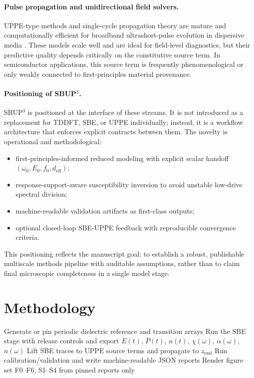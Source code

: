 \documentclass[aps,pra,twocolumn,reprint,superscriptaddress,nofootinbib]{revtex4-2}
\begin{document}
\paragraph{Pulse propagation and unidirectional field solvers.}
UPPE-type methods and single-cycle propagation theory are mature and
computationally efficient for broadband ultrashort-pulse evolution in dispersive
media \cite{brabec1997nonlinear,kolesik2002nonlinear,kolesik2004unidirectional}.
These models scale well and are ideal for field-level diagnostics, but their
predictive quality depends critically on the constitutive source term. In
semiconductor applications, this source term is frequently phenomenological or
only weakly connected to first-principles material provenance.

\paragraph{Positioning of SBUP$^3$.}
SBUP$^3$ is positioned at the interface of these streams. It is not introduced
as a replacement for TDDFT, SBE, or UPPE individually; instead, it is a
workflow architecture that enforces explicit contracts between them. The novelty
is operational and methodological:
\begin{itemize}
\item first-principles-informed reduced modeling with explicit scalar handoff
$(\omega_0, E_0, f_0, d_{\mathrm{eff}})$;
\item response-support-aware susceptibility inversion to avoid unstable
low-drive spectral division;
\item machine-readable validation artifacts as first-class outputs;
\item optional closed-loop SBE-UPPE feedback with reproducible convergence
criteria.
\end{itemize}
This positioning reflects the manuscript goal: to establish a robust,
publishable multiscale methods pipeline with auditable assumptions, rather than
to claim final microscopic completeness in a single model stage.

\section{Methodology}
\begin{algorithm}[t]
\caption{SBUP$^3$ end-to-end workflow (release protocol)}
Generate or pin periodic dielectric reference and transition arrays\;
Run the SBE stage with release controls and export
$E(t)$, $P(t)$, $n(t)$, $\chi(\omega)$, $\alpha(\omega)$, $n(\omega)$\;
Lift SBE traces to UPPE source terms and propagate
to $z_{\mathrm{end}}$\;
Run calibration/validation and write machine-readable JSON reports\;
Render figure set F0--F6, S1--S4 from pinned reports only\;
\end{algorithm}
\end{document}
